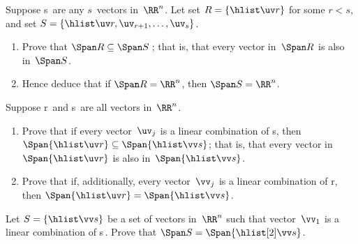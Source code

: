 \begin{exercise} \label{ex:} 
Suppose \hlist\uv s\ are any \(s\)~vectors in~\(\RR^n\).
Let set \(R=\{\hlist\uv r\}\) for some \(r<s\), and set \(S=\{\hlist\uv r,\uv_{r+1},\ldots,\uv_s\}\).
\begin{enumerate}
\item Prove that \(\Span R\subseteq\Span S\)\,; that is, that every vector in~\(\Span R\) is also in~\(\Span S\).
\item Hence deduce that if \(\Span R=\RR^n\), then \(\Span S=\RR^n\).
\end{enumerate}
\end{exercise}




\begin{exercise} \label{ex:} 
Suppose \hlist\uv r\ and \hlist\vv s\ are all vectors in~\(\RR^n\).
\begin{enumerate}
\item Prove that if every vector~\(\uv_j\) is a linear combination of \hlist\vv s, then \(\Span\{\hlist\uv r\}\subseteq\Span\{\hlist\vv s\}\); that is, that every vector in~\(\Span\{\hlist\uv r\}\) is also in~\(\Span\{\hlist\vv s\}\).
\item  Prove that if, additionally, every vector~\(\vv_j\) is a linear combination of \hlist\uv r, then \(\Span\{\hlist\uv r\}=\Span\{\hlist\vv s\}\).
\end{enumerate}
\end{exercise}





\begin{exercise} \label{ex:} 
Let \(S=\{\hlist\vv s\}\) be a set of vectors in~\(\RR^n\) such that vector~\(\vv_1\) is a linear combination of \hlist[2]\vv s\,.  
Prove that \(\Span S=\Span\{\hlist[2]\vv s\}\).
\end{exercise}







\begin{comment}%
why, what caused X?
how did X occur?
what-if? what-if-not?
how does X compare with Y?
what is the evidence for X?
why is X important?
\end{comment}



